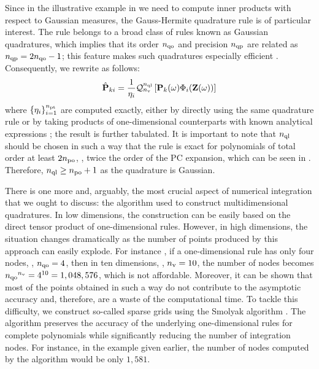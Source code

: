 Since in the illustrative example in  we need to compute inner products with respect to Gaussian measures, the Gauss-Hermite quadrature rule is of particular interest. The rule belongs to a broad class of rules known as Gaussian quadratures, which implies that its order ${n_\text{qo}}$ and precision ${n_\text{qp}}$ are related as ${n_\text{qp}} = 2 {n_\text{qo}} - 1$; this feature makes such quadratures especially efficient \cite{heiss2008}. Consequently, we rewrite  as follows:
\[
  \hat{\mathbf{P}}_{ki} = \frac{1}{\eta_i} \mathcal{Q}_{{n_\text{v}}}^{{n_\text{ql}}}\left[\mathbf{P}_k(\omega) \Phi_i(\mathbf{Z}(\omega))\right]
\]
where $\{ \eta_i \}_{i = 1}^{{n_\text{pt}}}$ are computed exactly, either by directly using the same quadrature rule or by taking products of one-dimensional counterparts with known analytical expressions \cite{xiu2010}; the result is further tabulated. It is important to note that ${n_\text{ql}}$ should be chosen in such a way that the rule is exact for polynomials of total order at least $2 {n_\text{po}}$, \ie, twice the order of the PC expansion, which can be seen in  \cite{eldred2009}. Therefore, ${n_\text{ql}} \geq {n_\text{po}} + 1$ as the quadrature is Gaussian.

There is one more and, arguably, the most crucial aspect of numerical integration that we ought to discuss: the algorithm used to construct multidimensional quadratures. In low dimensions, the construction can be easily based on the direct tensor product of one-dimensional rules. However, in high dimensions, the situation changes dramatically as the number of points produced by this approach can easily explode. For instance \cite{heiss2008}, if a one-dimensional rule has only four nodes, \ie, ${n_\text{qo}} = 4$, then in ten dimensions, \ie, ${n_\text{v}} = 10$, the number of nodes becomes ${n_\text{qo}}^{n_\text{v}} = 4^{10} = 1,048,576$, which is not affordable. Moreover, it can be shown that most of the points obtained in such a way do not contribute to the asymptotic accuracy and, therefore, are a waste of the computational time. To tackle this difficulty, we construct so-called sparse grids using the Smolyak algorithm \cite{eldred2009, maitre2010, heiss2008}. The algorithm preserves the accuracy of the underlying one-dimensional rules for complete polynomials while significantly reducing the number of integration nodes. For instance, in the example given earlier, the number of nodes computed by the algorithm would be only $1,581$.
